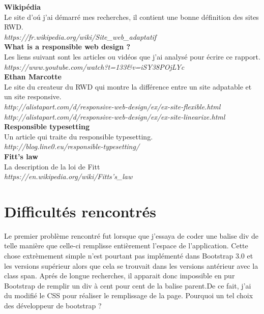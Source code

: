 \documentclass{article}
\begin{document}
{\textbf{Wikip\'edia}\\
Le site d'o\'u j'ai d\'emarr\'e mes recherches, il contient une bonne d\'efinition des sites RWD.\\
\textit{https://fr.wikipedia.org/wiki/Site\_web\_adaptatif}
\vspace{0.5cm}\\
\textbf{What is a responsible web design ?}\\
Les liens suivant sont les articles ou vid\'eos que j'ai analys\'e pour \'ecrire ce rapport.\\
\textit{https://www.youtube.com/watch?t=133\&v=iSY38POjLYc}
\vspace{0.5cm}\\
\textbf{Ethan Marcotte}\\
Le site du createur du RWD qui montre la diff\'erence entre un site adpatable et un site responsive.\\
\textit{http://alistapart.com/d/responsive-web-design/ex/ex-site-flexible.html}\\
\textit{http://alistapart.com/d/responsive-web-design/ex/ex-site-linearize.html}
\vspace{0.5cm}\\
\textbf{Responsible typesetting}\\
Un article qui traite du responsible typesetting.\\
\textit{http://blog.line0.eu/responsible-typesetting/}
\vspace{0.5cm}\\
\textbf{Fitt's law}\\
La description de la loi de Fitt\\
\textit{https://en.wikipedia.org/wiki/Fitts's\_law}



\section{Difficult\'es rencontr\'es}
\hspace*{0.6cm}Le premier probl\`eme rencontr\'e fut lorsque que j'essaya de coder une balise div de telle mani\`ere que celle-ci remplisse enti\`erement l'espace de l'application. Cette chose extr\`emement simple n'est pourtant pas impl\'ement\'e dans Bootstrap 3.0 et les versions sup\'erieur alors que cela se trouvait dans les versions ant\'erieur avec la class span. Apr\'es de longue recherches, il apparait donc impossible en pur Bootstrap de remplir un div \`a cent pour cent de la balise parent.De ce fait, j'ai du modifi\'e le CSS pour r\'ealiser le remplissage de la page. Pourquoi un tel choix des d\'eveloppeur de bootstrap ?

}
\end{document}
